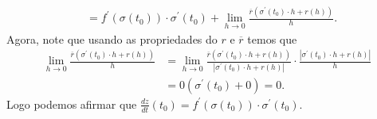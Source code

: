 \begin{homeworkProblem}
\begin{solution}
\begin{align*}
      &=f^{\prime}(\sigma(t_0))\cdot\sigma^{\prime}(t_0)+\lim_{h \to 0}\frac{\overline{r}(\sigma^{\prime}(t_0)\cdot h+r(h))}{h}.
    \end{align*}
    Agora, note que usando as propriedades do $r$ e $\overline{r}$ temos que 
    \begin{align*}
      \lim_{h \to 0}\frac{\overline{r}(\sigma^{\prime}(t_0)\cdot h+r(h))}{h}&=\lim_{h \to 0}\frac{\overline{r}(\sigma^{\prime}(t_0)\cdot h+r(h))}{|\sigma^{\prime}(t_0)\cdot h+r(h)|}\cdot\frac{|\sigma^{\prime}(t_0)\cdot h+r(h)|}{h}\\
      &=0(\sigma^{\prime}(t_0)+0)=0.
    \end{align*}
    Logo podemos afirmar que $\displaystyle \frac{dz}{dt}(t_0)=f^{\prime}(\sigma(t_0))\cdot\sigma^{\prime}(t_0)$.
  \end{solution}
\end{homeworkProblem}
